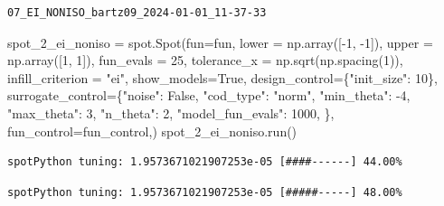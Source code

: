 \documentclass[
  letterpaper,
  DIV=11,
  numbers=noendperiod]{scrreprt}
\newenvironment{Shaded}{\begin{snugshade}}{\end{snugshade}}
\newcommand{\DecValTok}[1]{\textcolor[rgb]{0.68,0.00,0.00}{#1}}
\newcommand{\NormalTok}[1]{\textcolor[rgb]{0.00,0.23,0.31}{#1}}
\newcommand{\OperatorTok}[1]{\textcolor[rgb]{0.37,0.37,0.37}{#1}}
\newcommand{\StringTok}[1]{\textcolor[rgb]{0.13,0.47,0.30}{#1}}
\newcommand{\VariableTok}[1]{\textcolor[rgb]{0.07,0.07,0.07}{#1}}
\begin{document}
\begin{verbatim}
07_EI_NONISO_bartz09_2024-01-01_11-37-33
\end{verbatim}

\begin{Shaded}
\begin{Highlighting}[]
\NormalTok{spot\_2\_ei\_noniso }\OperatorTok{=}\NormalTok{ spot.Spot(fun}\OperatorTok{=}\NormalTok{fun,}
\NormalTok{                   lower }\OperatorTok{=}\NormalTok{ np.array([}\OperatorTok{{-}}\DecValTok{1}\NormalTok{, }\OperatorTok{{-}}\DecValTok{1}\NormalTok{]),}
\NormalTok{                   upper }\OperatorTok{=}\NormalTok{ np.array([}\DecValTok{1}\NormalTok{, }\DecValTok{1}\NormalTok{]),}
\NormalTok{                   fun\_evals }\OperatorTok{=} \DecValTok{25}\NormalTok{,}
\NormalTok{                   tolerance\_x }\OperatorTok{=}\NormalTok{ np.sqrt(np.spacing(}\DecValTok{1}\NormalTok{)),}
\NormalTok{                   infill\_criterion }\OperatorTok{=} \StringTok{"ei"}\NormalTok{,}
\NormalTok{                   show\_models}\OperatorTok{=}\VariableTok{True}\NormalTok{,}
\NormalTok{                   design\_control}\OperatorTok{=}\NormalTok{\{}\StringTok{"init\_size"}\NormalTok{: }\DecValTok{10}\NormalTok{\},}
\NormalTok{                   surrogate\_control}\OperatorTok{=}\NormalTok{\{}\StringTok{"noise"}\NormalTok{: }\VariableTok{False}\NormalTok{,}
                                      \StringTok{"cod\_type"}\NormalTok{: }\StringTok{"norm"}\NormalTok{,}
                                      \StringTok{"min\_theta"}\NormalTok{: }\OperatorTok{{-}}\DecValTok{4}\NormalTok{,}
                                      \StringTok{"max\_theta"}\NormalTok{: }\DecValTok{3}\NormalTok{,}
                                      \StringTok{"n\_theta"}\NormalTok{: }\DecValTok{2}\NormalTok{,}
                                      \StringTok{"model\_fun\_evals"}\NormalTok{: }\DecValTok{1000}\NormalTok{,}
\NormalTok{                                      \},}
\NormalTok{                    fun\_control}\OperatorTok{=}\NormalTok{fun\_control,)}
\NormalTok{spot\_2\_ei\_noniso.run()}
\end{Highlighting}
\end{Shaded}

\begin{verbatim}
spotPython tuning: 1.9573671021907253e-05 [####------] 44.00% 
\end{verbatim}

\begin{verbatim}
spotPython tuning: 1.9573671021907253e-05 [#####-----] 48.00% 
\end{verbatim}
\end{document}
